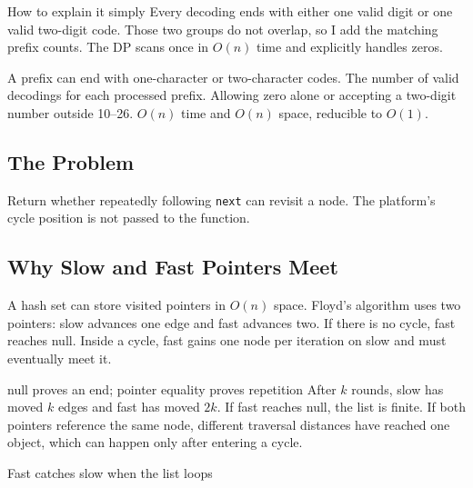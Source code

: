 \begin{revisionbox}{How to explain it simply}
Every decoding ends with either one valid digit or one valid two-digit code.
Those two groups do not overlap, so I add the matching prefix counts. The
DP scans once in \(O(n)\) time and explicitly handles zeros.
\end{revisionbox}
\chaptercheckpoint
  {A prefix can end with one-character or two-character codes.}
  {The number of valid decodings for each processed prefix.}
  {Allowing zero alone or accepting a two-digit number outside 10--26.}
  {$O(n)$ time and $O(n)$ space, reducible to $O(1)$.}
\judgeclassnote



\subsection{The Problem}
Return whether repeatedly following \texttt{next} can revisit a node. The
platform's cycle position is not passed to the function.

\subsection{Why Slow and Fast Pointers Meet}
A hash set can store visited pointers in \(O(n)\) space. Floyd's algorithm uses
two pointers: slow advances one edge and fast advances two. If there is no
cycle, fast reaches null. Inside a cycle, fast gains one node per iteration on
slow and must eventually meet it.

\begin{invariantbox}{null proves an end; pointer equality proves repetition}
After \(k\) rounds, slow has moved \(k\) edges and fast has moved \(2k\). If
fast reaches null, the list is finite. If both pointers reference the same
node, different traversal distances have reached one object, which can happen
only after entering a cycle.
\end{invariantbox}

\begin{visualbox}{Fast catches slow when the list loops}
\centering
{}
\end{visualbox}

